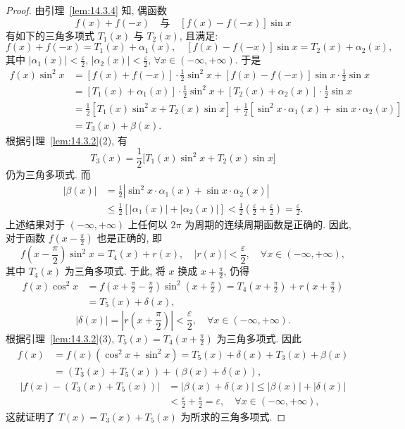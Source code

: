 \begin{proof}
由引理~\ref{lem:14.3.4} 知, 偶函数
\[
  f(x)+f(-x)\quad\text{与}\quad[f(x)-f(-x)]\sin x
\]
有如下的三角多项式 $T_{1}(x)$ 与 $T_{2}(x)$, 且满足:
\[
  f(x)+f(-x)=T_{1}(x)+\alpha_{1}(x),\quad\left[f(x)-f(-x)\right]\sin x=T_{2}(x)+\alpha_{2}(x),
\]
其中 $|\alpha_{1}(x)|<\frac{\varepsilon}{2}$, $|\alpha_{2}(x)|<\frac{\varepsilon}{2}$, $\forall x\in(-\infty,+\infty)$. 于是
\[
  \begin{aligned}
    f(x)\sin^{2}x&=\left[f(x)+f(-x)\right]\cdot\frac{1}{2}\sin^{2}x+\left[f(x)-f(-x)\right]\sin x\cdot\frac{1}{2}\sin x\\
    &=\left[T_{1}(x)+\alpha_{1}(x)\right]\cdot\frac{1}{2}\sin^{2}x+\left[T_{2}(x)+\alpha_{2}(x)\right]\cdot\frac{1}{2}\sin x\\
    &=\frac{1}{2}\left[T_{1}(x)\sin^{2}x+T_{2}(x)\sin x\right]+\frac{1}{2}\left[\sin^{2}x\cdot\alpha_{1}(x)+\sin x\cdot\alpha_{2}(x)\right]\\
    &=T_{3}(x)+\beta(x).
  \end{aligned}
\]
根据引理~\ref{lem:14.3.2}(2), 有
\[
  T_{3}(x)=\frac{1}{2}\bigl[T_{1}(x)\sin^{2}x+T_{2}(x)\sin x\bigr]
\]
仍为三角多项式. 而
\[
  \begin{aligned}
    |\beta(x)|&=\frac{1}{2}\left|\sin^{2}x\cdot\alpha_{1}(x)+\sin x\cdot\alpha_{2}(x)\right|\\
    &\leqslant\frac{1}{2}\left[|\alpha_{1}(x)|+|\alpha_{2}(x)|\right]<\frac{1}{2}\left(\frac{\varepsilon}{2}+\frac{\varepsilon}{2}\right)=\frac{\varepsilon}{2}.
  \end{aligned}
\]
上述结果对于 $(-\infty,+\infty)$ 上任何以 $2\pi$ 为周期的连续周期函数是正确的. 因此, 对于函数 $f\left(x-\frac{\pi}{2}\right)$ 也是正确的, 即
\[
  f\left(x-\frac{\pi}{2}\right)\sin^{2}x=T_{4}(x)+r(x),\quad|r(x)|<\frac{\varepsilon}{2},\quad\forall x\in(-\infty,+\infty),
\]
其中 $T_{4}(x)$ 为三角多项式. 于此, 将 $x$ 换成 $x+\frac{\pi}{2}$, 仍得
\[
  \begin{aligned}
    f(x)\cos^{2}x&=f\left(x+\frac{\pi}{2}-\frac{\pi}{2}\right)\sin^{2}\left(x+\frac{\pi}{2}\right)=T_{4}\left(x+\frac{\pi}{2}\right)+r\left(x+\frac{\pi}{2}\right)\\
    &=T_{5}(x)+\delta(x),
  \end{aligned}
\]
\[
  |\delta(x)|=|r\left(x+\frac{\pi}{2}\right)|<\frac{\varepsilon}{2},\quad\forall x\in(-\infty,+\infty).
\]
根据引理~\ref{lem:14.3.2}(3), $T_{5}(x)=T_{4}\left(x+\frac{\pi}{2}\right)$ 为三角多项式. 因此
\[
  \begin{aligned}
    f(x)&=f(x)(\cos^{2}x+\sin^{2}x)=T_{5}(x)+\delta(x)+T_{3}(x)+\beta(x)\\
    &=(T_{3}(x)+T_{5}(x))+(\beta(x)+\delta(x)),
  \end{aligned}
\]
\[
  \begin{aligned}
    |f(x)-(T_{3}(x)+T_{5}(x))|&=|\beta(x)+\delta(x)|\leqslant|\beta(x)|+|\delta(x)|\\
    &<\frac{\varepsilon}{2}+\frac{\varepsilon}{2}=\varepsilon,\quad\forall x\in(-\infty,+\infty),
  \end{aligned}
\]
这就证明了 $T(x)=T_{3}(x)+T_{5}(x)$ 为所求的三角多项式.
\end{proof}

